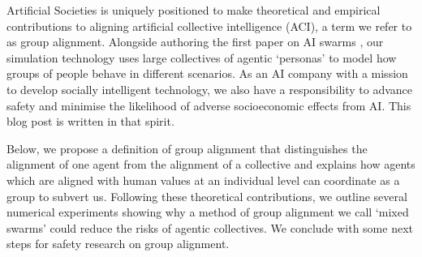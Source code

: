 Artificial Societies is uniquely positioned to make theoretical and empirical contributions to aligning artificial collective intelligence (ACI), a term we refer to as group alignment. Alongside authoring the first paper on AI swarms \parencite{he_artificial_2024}, our simulation technology uses large collectives of agentic ‘personas’ to model how groups of people behave in different scenarios. As an AI company with a mission to develop socially intelligent technology, we also have a responsibility to advance safety and minimise the likelihood of adverse socioeconomic effects from AI. This blog post is written in that spirit.

Below, we propose a definition of group alignment that distinguishes the alignment of one agent from the alignment of a collective and explains how agents which are aligned with human values at an individual level can coordinate as a group to subvert us. Following these theoretical contributions, we outline several numerical experiments showing why a method of group alignment we call ‘mixed swarms’ could reduce the risks of agentic collectives. We conclude with some next steps for safety research on group alignment.
